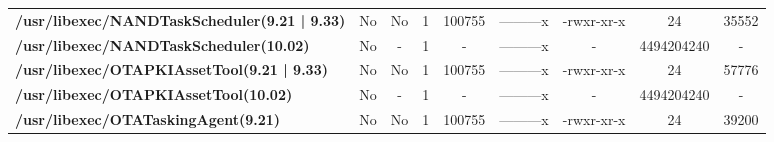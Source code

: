 \begin{center}
{\begin{tabular}{|>{\bfseries} l | C | C | C | C | C | C | C | C |}
					/usr/libexec/NANDTaskScheduler(9.21 | 9.33) & No & No & \color{green}1 & \color{red}100755 & \color{green}---------x & \color{red}-rwxr-xr-x & \color{green}24 & \color{red}35552\\ 
					/usr/libexec/NANDTaskScheduler(10.02) & No & - & 1 & - & ---------x & - & 4494204240 & -\\ 
					/usr/libexec/OTAPKIAssetTool(9.21 | 9.33) & No & No & \color{green}1 & \color{red}100755 & \color{green}---------x & \color{red}-rwxr-xr-x & \color{green}24 & \color{red}57776\\ 
					/usr/libexec/OTAPKIAssetTool(10.02) & No & - & 1 & - & ---------x & - & 4494204240 & -\\ 
					/usr/libexec/OTATaskingAgent(9.21) & No & No & \color{green}1 & \color{red}100755 & \color{green}---------x & \color{red}-rwxr-xr-x & \color{green}24 & \color{red}39200\\ 

			\end{tabular}
		}
	\end{center}


